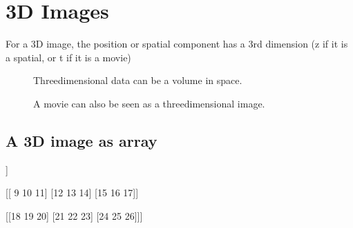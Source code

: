 \documentclass[letterpaper,10pt,english]{sphinxmanual}
\begin{document}
\noindent{}


\section{3D Images}
\label{\detokenize{01-Introduction:d-images}}
\sphinxAtStartPar
For a 3D image, the position or spatial component has a 3rd dimension (z if it is a spatial, or t if it is a movie)



\begin{figure}[htbp]
\centering
\capstart

\noindent{}
\caption{Three\sphinxhyphen{}dimensional data can be a volume in space.}\label{\detokenize{01-Introduction:id16}}\end{figure}

\begin{figure}[htbp]
\centering
\capstart

\noindent{}
\caption{A movie can also be seen as a three\sphinxhyphen{}dimensional image.}\label{\detokenize{01-Introduction:id17}}\end{figure}


\subsection{A 3D image as array}
\label{\detokenize{01-Introduction:a-3d-image-as-array}}
\begin{sphinxVerbatim}[commandchars=\\\{\}]
   
  
\end{sphinxVerbatim}

\begin{sphinxVerbatim}[commandchars=\\\{\}]
[[[ 0  1  2]
  [ 3  4  5]
  [ 6  7  8]]

 [[ 9 10 11]
  [12 13 14]
  [15 16 17]]

 [[18 19 20]
  [21 22 23]
  [24 25 26]]]
\end{sphinxVerbatim}
\end{document}
